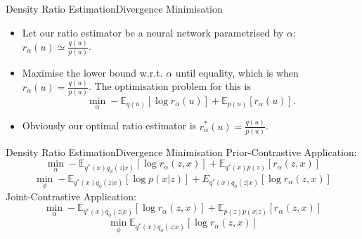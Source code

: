 \documentclass{beamer}
\newcommand{\E}{\mathbb{E}}
\begin{document}
\begin{frame}{Density Ratio Estimation}{Divergence Minimisation}
\begin{itemize}
\item Let our ratio estimator be a neural network parametrised by $\alpha$: $r_\alpha(u)\simeq \frac{q(u)}{p(u)}$.
\item Maximise the lower bound w.r.t. $\alpha$ until equality, which is when $r_\alpha(u)=\frac{q(u)}{p(u)}$. The optimisation problem for this is
\[\min_\alpha -\mathbb{E}_{q(u)}[\log r_\alpha(u)]+\mathbb{E}_{p(u)}[r_\alpha(u)].\]
\item Obviously our optimal ratio estimator is $r^*_\alpha(u)=\frac{q(u)}{p(u)}$.
\end{itemize}
\end{frame}
\begin{frame}{Density Ratio Estimation}{Divergence Minimisation}
Prior-Contrastive Application:
\[\min_\alpha -\E_{q^*(x)q_\phi(z|x)}[\log r_\alpha(z,x)]+\E_{q^*(x)p(z)}[r_\alpha (z,x)]\]
\[\min_\phi -\mathbb{E}_{q^*(x)q_\phi(z|x)}\left[\log p(x|z)\right]+E_{q^*(x)q_\phi (z|x)}[\log r_\alpha(z,x)]\]
Joint-Contrastive Application:
\[\min_\alpha-\E_{q^*(x)q_\phi(z|x)}[\log r_\alpha(z,x)]+\E_{p(z)p(x|z)}[r_\alpha(z,x)]\]
\[\min_\phi \mathbb{E}_{q^*(x)q_\phi(z|x)}[\log r_\alpha(z,x)]\]
\end{frame}
\end{document}
